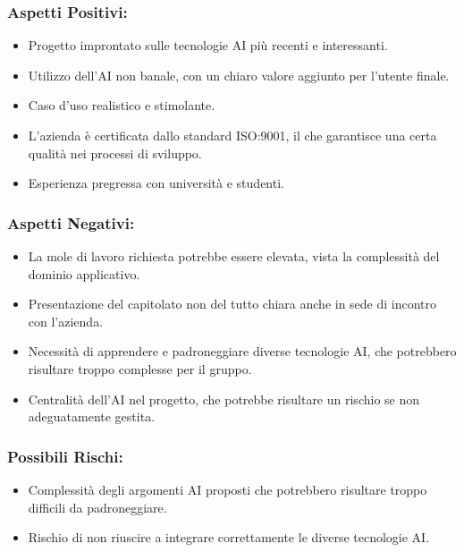 \documentclass[a4paper,12pt]{article}
\begin{document}
\subsubsection*{Aspetti Positivi:}
\begin{itemize}
    \item Progetto improntato sulle tecnologie AI più recenti e interessanti.
    \item Utilizzo dell'AI non banale, con un chiaro valore aggiunto per l'utente finale.
    \item Caso d'uso realistico e stimolante.
    \item L'azienda è certificata dallo standard ISO:9001, il che garantisce una certa qualità nei processi di sviluppo.
    \item Esperienza pregressa con università e studenti.
\end{itemize}

\subsubsection*{Aspetti Negativi:}
\begin{itemize}
    \item La mole di lavoro richiesta potrebbe essere elevata, vista la complessità del dominio applicativo.
    \item Presentazione del capitolato non del tutto chiara anche in sede di incontro con l'azienda.
    \item Necessità di apprendere e padroneggiare diverse tecnologie AI, che potrebbero risultare troppo complesse per il gruppo.
    \item Centralità dell'AI nel progetto, che potrebbe risultare un rischio se non adeguatamente gestita.
\end{itemize}

\subsubsection*{Possibili Rischi:}
\begin{itemize}
    \item Complessità degli argomenti AI proposti che potrebbero risultare troppo difficili da padroneggiare.
    \item Rischio di non riuscire a integrare correttamente le diverse tecnologie AI.
\end{itemize}
\end{document}
